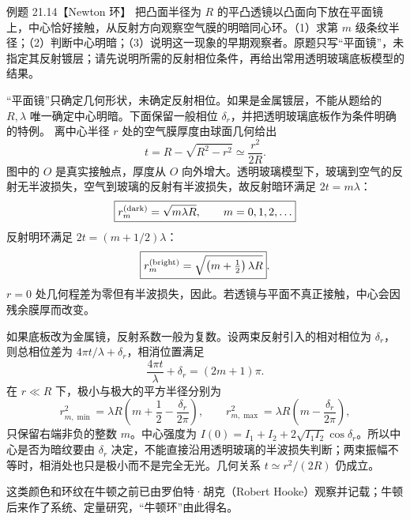 \begin{origexamplebox}{例题 21.14【Newton 环】}
把凸面半径为 $R$ 的平凸透镜以凸面向下放在平面镜上，中心恰好接触，从反射方向观察空气膜的明暗同心环。（1）求第 $m$ 级条纹半径；（2）判断中心明暗；（3）说明这一现象的早期观察者。原题只写“平面镜”，未指定其反射镀层；请先说明所需的反射相位条件，再给出常用透明玻璃底板模型的结果。
\end{origexamplebox}
\begin{xesolution}
“平面镜”只确定几何形状，未确定反射相位。如果是金属镀层，不能从题给的 $R,\lambda$ 唯一确定中心明暗。下面保留一般相位 $\delta_r$，并把透明玻璃底板作为条件明确的特例。
离中心半径 $r$ 处的空气膜厚度由球面几何给出
\[
 t=R-\sqrt{R^2-r^2}\simeq\frac{r^2}{2R}.
\]
图中的 $O$ 是真实接触点，厚度从 $O$ 向外增大。透明玻璃模型下，玻璃到空气的反射无半波损失，空气到玻璃的反射有半波损失，故反射暗环满足 $2t=m\lambda$：
\[
 \boxed{r_m^{(\rm dark)}=\sqrt{m\lambda R},\qquad m=0,1,2,\ldots}
\]
反射明环满足 $2t=(m+1/2)\lambda$：
\[
 \boxed{r_m^{(\rm bright)}=\sqrt{\left(m+\tfrac12\right)\lambda R}}.
\]
$r=0$ 处几何程差为零但有半波损失，因此。若透镜与平面不真正接触，中心会因残余膜厚而改变。

如果底板改为金属镜，反射系数一般为复数。设两束反射引入的相对相位为 $\delta_r$，则总相位差为 $4\pi t/\lambda+\delta_r$，相消位置满足
\[
 \frac{4\pi t}{\lambda}+\delta_r=(2m+1)\pi.
\]
在 $r\ll R$ 下，极小与极大的平方半径分别为
\[
 r_{m,\min}^2=\lambda R\left(m+\frac12-\frac{\delta_r}{2\pi}\right),\qquad
 r_{m,\max}^2=\lambda R\left(m-\frac{\delta_r}{2\pi}\right),
\]
只保留右端非负的整数 $m$。中心强度为 $I(0)=I_1+I_2+2\sqrt{I_1I_2}\cos\delta_r$。所以中心是否为暗纹要由 $\delta_r$ 决定，不能直接沿用透明玻璃的半波损失判断；两束振幅不等时，相消处也只是极小而不是完全无光。几何关系 $t\simeq r^2/(2R)$ 仍成立。

这类颜色和环纹在牛顿之前已由罗伯特·胡克（Robert Hooke）观察并记载；牛顿后来作了系统、定量研究，“牛顿环”由此得名。
\end{xesolution}
